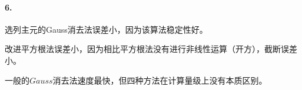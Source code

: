 \documentclass{ctexart}
\begin{document}
\paragraph{6.}
选列主元的Gauss消去法误差小，因为该算法稳定性好。

改进平方根法误差小，因为相比平方根法没有进行非线性运算（开方），截断误差小。

一般的$Gauss$消去法速度最快，但四种方法在计算量级上没有本质区别。
\end{document}
